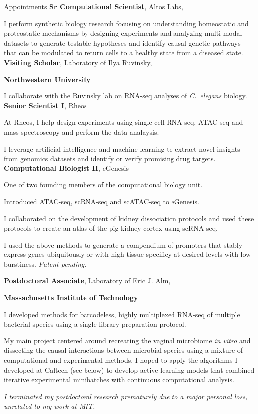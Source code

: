 \begin{rubric}{Appointments}
		\textbf{Sr Computational Scientist}, Altos Labs,\par
		I perform synthetic biology research focusing on understanding homeostatic
		and proteostatic mechanisms by designing experiments and analyzing multi-modal
		datasets to generate testable hypotheses and identify causal genetic pathways
		that can be modulated to return cells to a healthy state from a diseased
		state.
	\textbf{Visiting Scholar}, Laboratory of Ilya Ruvinsky,\par
	\textbf{Northwestern University}\par
	I collaborate with the Ruvinsky lab on RNA-seq analyses of \textit{C.~elegans}
	biology.
\entry*[03/2021 - 01/2022]
	\textbf{Senior Scientist I}, Rheos\par
	At Rheos, I help design experiments using single-cell RNA-seq, ATAC-seq and
	mass spectroscopy and perform the data analaysis.\par
	I leverage artificial intelligence and machine learning to extract novel
	insights from genomics datasets and identify or verify promising drug targets.
\entry*[11/2019 - 3/2021]
	\textbf{Computational Biologist II}, eGenesis\par
	One of two founding members of the computational biology unit.\par
	Introduced ATAC-seq, scRNA-seq and scATAC-seq to eGenesis.\par
	I collaborated on the development of kidney dissociation protocols and used
	these protocols to create an atlas of the pig kidney cortex using scRNA-seq.\par
	I used the above methods to generate a compendium of promoters that stably
	express genes ubiquitously or with high tissue-specificy at desired levels with
	low burstiness. \textit{Patent pending}.

\entry*[01/2019--11/2019]
		\textbf{Postdoctoral Associate}, Laboratory of Eric J. Alm,\par
		\textbf{Massachusetts Institute of Technology}\par
		I developed methods for barcodeless, highly multiplexed RNA-seq of multiple
		bacterial species using a single library preparation protocol. \par
		My main project centered around recreating the vaginal microbiome \textit{in
		vitro} and dissecting the causal interactions between microbial species
		using a mixture of computational and experimental methods. I hoped to apply
		the algorithms I developed at Caltech (see below) to develop active learning
		models that combined iterative experimental minibatches with continuous
		computational analysis.\par
		\textit{I terminated my postdoctoral research prematurely due to a major
		personal loss, unrelated to my work at MIT.}


\end{rubric}
